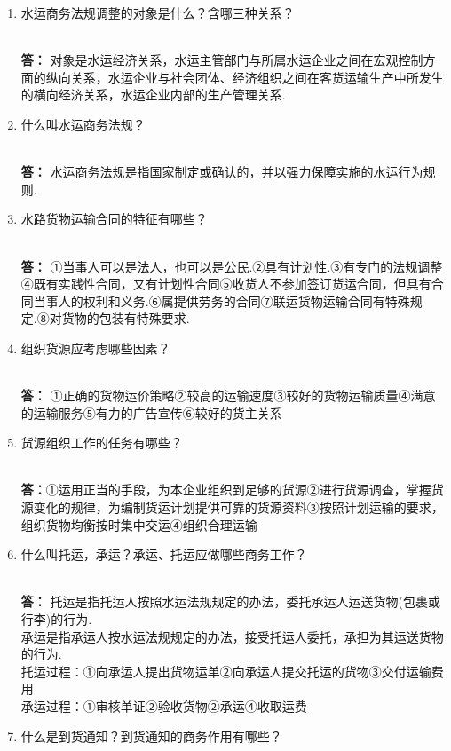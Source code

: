 \documentclass[UTF8]{ctexart}
\begin{document}
\begin{enumerate}[1]
\item \begin{CJK}{UTF8}{you} 水运商务法规调整的对象是什么？含哪三种关系？\end{CJK}
\\ \textbf{答：} 对象是水运经济关系，水运主管部门与所属水运企业之间在宏观控制方面的纵向关系，水运企业与社会团体、经济组织之间在客货运输生产中所发生的横向经济关系，水运企业内部的生产管理关系.
\item \begin{CJK}{UTF8}{you}什么叫水运商务法规？\end{CJK}
\\ \textbf{答：} 水运商务法规是指国家制定或确认的，并以强力保障实施的水运行为规则.
\item \begin{CJK}{UTF8}{you}水路货物运输合同的特征有哪些？\end{CJK}
\\ \textbf{答：} ①当事人可以是法人，也可以是公民.②具有计划性.③有专门的法规调整④既有实践性合同，又有计划性合同⑤收货人不参加签订货运合同，但具有合同当事人的权利和义务.⑥属提供劳务的合同⑦联运货物运输合同有特殊规定.⑧对货物的包装有特殊要求.
\item \begin{CJK}{UTF8}{you}组织货源应考虑哪些因素？\end{CJK}
\\ \textbf{答：} ①正确的货物运价策略②较高的运输速度③较好的货物运输质量④满意的运输服务⑤有力的广告宣传⑥较好的货主关系
\item \begin{CJK}{UTF8}{you} 货源组织工作的任务有哪些？\end{CJK}
\\ \textbf{答：}①运用正当的手段，为本企业组织到足够的货源②进行货源调查，掌握货源变化的规律，为编制货运计划提供可靠的货源资料③按照计划运输的要求，组织货物均衡按时集中交运④组织合理运输
\item \begin{CJK}{UTF8}{you} 什么叫托运，承运？承运、托运应做哪些商务工作？\end{CJK}
\\ \textbf{答：} 托运是指托运人按照水运法规规定的办法，委托承运人运送货物(包裹或行李)的行为.
\\ 承运是指承运人按水运法规规定的办法，接受托运人委托，承担为其运送货物的行为.
\\ 托运过程：①向承运人提出货物运单②向承运人提交托运的货物③交付运输费用
\\ 承运过程：①审核单证②验收货物②承运④收取运费
\item \begin{CJK}{UTF8}{you} 什么是到货通知？到货通知的商务作用有哪些？\end{CJK}

\end{enumerate}
\end{document}
